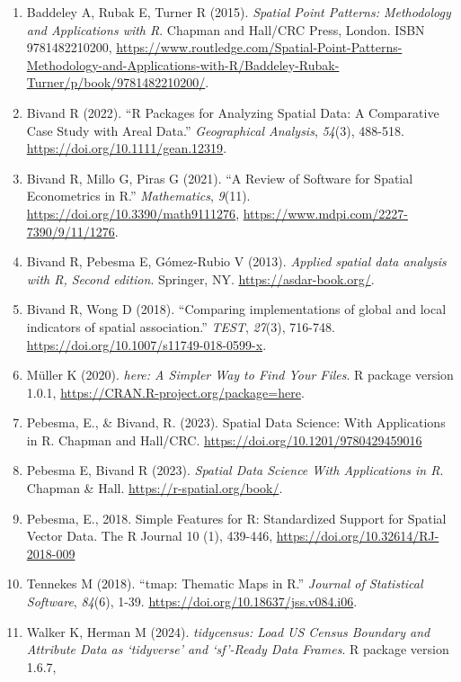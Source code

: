 \documentclass[
]{article}
\providecommand{\tightlist}{%
  \setlength{\itemsep}{0pt}\setlength{\parskip}{0pt}}
\begin{document}
\begin{enumerate}
\def\labelenumi{\arabic{enumi}.}
\tightlist
\item
  Baddeley A, Rubak E, Turner R (2015). \emph{Spatial Point Patterns:
  Methodology and Applications with R}. Chapman and Hall/CRC Press,
  London. ISBN 9781482210200,
  \url{https://www.routledge.com/Spatial-Point-Patterns-Methodology-and-Applications-with-R/Baddeley-Rubak-Turner/p/book/9781482210200/}.
\item
  Bivand R (2022). ``R Packages for Analyzing Spatial Data: A
  Comparative Case Study with Areal Data.'' \emph{Geographical
  Analysis}, \emph{54}(3), 488-518.
  \url{https://doi.org/10.1111/gean.12319}.
\item
  Bivand R, Millo G, Piras G (2021). ``A Review of Software for Spatial
  Econometrics in R.'' \emph{Mathematics}, \emph{9}(11).
  \url{https://doi.org/10.3390/math9111276},
  \url{https://www.mdpi.com/2227-7390/9/11/1276}.
\item
  Bivand R, Pebesma E, Gómez-Rubio V (2013). \emph{Applied spatial data
  analysis with R, Second edition}. Springer, NY.
  \url{https://asdar-book.org/}.
\item
  Bivand R, Wong D (2018). ``Comparing implementations of global and
  local indicators of spatial association.'' \emph{TEST}, \emph{27}(3),
  716-748. \url{https://doi.org/10.1007/s11749-018-0599-x}.
\item
  Müller K (2020). \emph{here: A Simpler Way to Find Your Files}. R
  package version 1.0.1, \url{https://CRAN.R-project.org/package=here}.
\item
  Pebesma, E., \& Bivand, R. (2023). Spatial Data Science: With
  Applications in R. Chapman and Hall/CRC.
  \url{https://doi.org/10.1201/9780429459016}
\item
  Pebesma E, Bivand R (2023). \emph{Spatial Data Science With
  Applications in R}. Chapman \& Hall.
  \url{https://r-spatial.org/book/}.
\item
  Pebesma, E., 2018. Simple Features for R: Standardized Support for
  Spatial Vector Data. The R Journal 10 (1), 439-446,
  \url{https://doi.org/10.32614/RJ-2018-009}
\item
  Tennekes M (2018). ``tmap: Thematic Maps in R.'' \emph{Journal of
  Statistical Software}, \emph{84}(6), 1-39.
  \url{https://doi.org/10.18637/jss.v084.i06}.
\item
  Walker K, Herman M (2024). \emph{tidycensus: Load US Census Boundary
  and Attribute Data as `tidyverse' and `sf'-Ready Data Frames}. R
  package version 1.6.7,

\end{enumerate}
\end{document}
